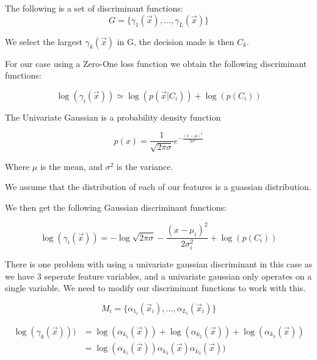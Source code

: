 \documentclass[a4paper]{article}
\begin{document}
The following is a set of discriminant functions:
\begin{equation}
G = \lbrace \gamma_1(\vec x),...,\gamma_L(\vec x) \rbrace
\end{equation}

We select the largest $\gamma_k(\vec x)$ in G, the decision made is
then $C_k$. 

For our case using a Zero-One loss function we obtain the following discriminant functions:

\begin{equation}
\log(\gamma_i(\vec x)) \simeq \log(p(\vec x|C_i)) + \log(p(C_i))
\end{equation}

The Univariate Gaussian is a probability density function

\begin{equation}
p(x) = \frac{1}{\sqrt{2 \pi \sigma}}e^{-\frac{(x - \mu)^2}{2 \sigma^2}}
\end{equation} 

Where $\mu$ is the mean, and $\sigma^2$ is the variance.

We assume that the distribution of each of our features is a
guassian distribution.

We then get the following Gaussian discriminant functions:

\begin{equation}
\log(\gamma_i(\vec x)) = -\log\sqrt{2 \pi \sigma} - \frac{(x - \mu_i)^2}{2 \sigma^2_i} + \log(p(C_i))
\end{equation}

There is one problem with using a univariate gaussian discriminant in this case as we have 3 seperate
feature variables, and a univariate gaussian only operates on a single variable. We need to modify
our discriminant functions to work with this.


\begin{equation}
M_i = \lbrace \alpha_{1_i}(\vec x_i),...,\alpha_{L_i}(\vec x_i) \rbrace
\end{equation}

\begin{equation}
\begin{split}
\log(\gamma_k(\vec x))) &= \log(\alpha_{k_1}(\vec x)) + \log(\alpha_{k_2}(\vec x)) + \log(\alpha_{k_3}(\vec x))\\
 &= \log(\alpha_{k_1}(\vec x)) \alpha_{k_2}(\vec x) \alpha_{k_3}(\vec x))
\end{split}
\end{equation}
\end{document}
